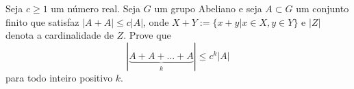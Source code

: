 Seja \(c \ge 1\) um número real. Seja \(G\) um grupo Abeliano e seja \(A \subset G\) um conjunto finito que satisfaz \(|A+A| \le c|A|\), onde \(X+Y:= \{x+y| x \in X, y \in Y\}\) e \(|Z|\) denota a cardinalidade de \(Z\). Prove que
\[
|\underbrace{A+A+\dots+A}_k| \le c^k |A|
\]
para todo inteiro positivo \(k\).
